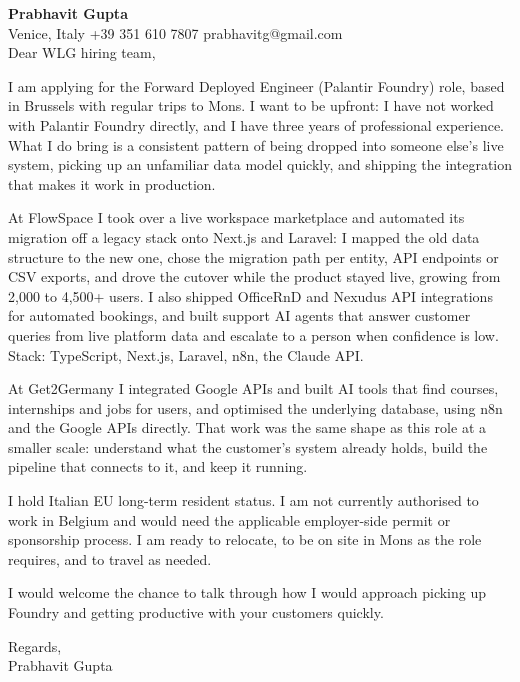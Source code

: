 \documentclass[a4paper,10.5pt]{article}
\begin{document}
\textbf{Prabhavit Gupta}\\
Venice, Italy \textbar{} +39 351 610 7807 \textbar{} prabhavitg@gmail.com\\[10pt]
Dear WLG hiring team,

I am applying for the Forward Deployed Engineer (Palantir Foundry) role, based in Brussels with regular trips to Mons. I want to be upfront: I have not worked with Palantir Foundry directly, and I have three years of professional experience. What I do bring is a consistent pattern of being dropped into someone else's live system, picking up an unfamiliar data model quickly, and shipping the integration that makes it work in production.

At FlowSpace I took over a live workspace marketplace and automated its migration off a legacy stack onto Next.js and Laravel: I mapped the old data structure to the new one, chose the migration path per entity, API endpoints or CSV exports, and drove the cutover while the product stayed live, growing from 2,000 to 4,500+ users. I also shipped OfficeRnD and Nexudus API integrations for automated bookings, and built support AI agents that answer customer queries from live platform data and escalate to a person when confidence is low. Stack: TypeScript, Next.js, Laravel, n8n, the Claude API.

At Get2Germany I integrated Google APIs and built AI tools that find courses, internships and jobs for users, and optimised the underlying database, using n8n and the Google APIs directly. That work was the same shape as this role at a smaller scale: understand what the customer's system already holds, build the pipeline that connects to it, and keep it running.

I hold Italian EU long-term resident status. I am not currently authorised to work in Belgium and would need the applicable employer-side permit or sponsorship process. I am ready to relocate, to be on site in Mons as the role requires, and to travel as needed.

I would welcome the chance to talk through how I would approach picking up Foundry and getting productive with your customers quickly.

Regards,\\
Prabhavit Gupta
\end{document}
